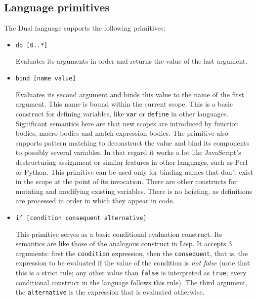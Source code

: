 \subsection{Language primitives}
  The Dual language supports the following
primitives:
\begin{itemize}
    \item \texttt{do [0..*]}
    
    Evaluates its arguments in order and returns the value of the last argument.
    
    \item \texttt{bind [name value]}
    
    Evaluates its second argument and binds this value to the name of the first
    argument. This name is bound within the current scope. This is a basic
    construct for defining variables, like \texttt{var} or \texttt{define} in
    other languages. Significant semantics here are that new scopes are
    introduced by function bodies, macro bodies and match expression bodies. The
    primitive also supports pattern matching to deconstruct the value and bind
    its components to possibly several variables. In that regard it works a lot
    like JavaScript's destructuring
    assignment\cite{mdn_destructuring}
    or similar features in other languages, such as Perl or Python. This
    primitive can be used only for binding names that don't exist in the scope
    at the point of its invocation. There are other constructs for mutating and
    modifying existing variables. There is no
    hoisting\cite[Section~var hoisting]{mdn_var},
    as definitions are processed in order in which they appear in code.
    
    \item \texttt{if [condition consequent alternative]}
    
    This primitive serves as a basic conditional evaluation construct. Its
    semantics are like those of the analogous construct in Lisp. It accepts 3
    arguments: first the \texttt{condition} expression, then the
    \texttt{consequent}, that is, the expression to be evaluated if the value of
    the condition is \textit{not false} (note that this is a strict rule; any
    other value than \texttt{false} is interpreted as \texttt{true}; every
    conditional construct in the language follows this rule). The third
    argument, the \texttt{alternative} is the expression that is evaluated
    otherwise.
    

\end{itemize}
